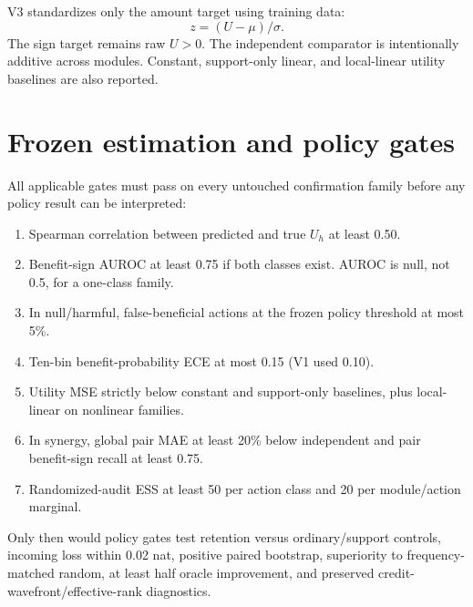 \documentclass[11pt]{article}
\begin{document}
V3 standardizes only the amount target using training data:
\[
 z=(U-\mu)/\sigma.
\]
The sign target remains raw $U>0$. The independent comparator is intentionally additive across modules. Constant, support-only linear, and local-linear utility baselines are also reported.

\section{Frozen estimation and policy gates}
All applicable gates must pass on every untouched confirmation family before any policy result can be interpreted:
\begin{enumerate}
\item Spearman correlation between predicted and true $U_h$ at least 0.50.
\item Benefit-sign AUROC at least 0.75 if both classes exist. AUROC is null, not 0.5, for a one-class family.
\item In null/harmful, false-beneficial actions at the frozen policy threshold at most 5\%.
\item Ten-bin benefit-probability ECE at most 0.15 (V1 used 0.10).
\item Utility MSE strictly below constant and support-only baselines, plus local-linear on nonlinear families.
\item In synergy, global pair MAE at least 20\% below independent and pair benefit-sign recall at least 0.75.
\item Randomized-audit ESS at least 50 per action class and 20 per module/action marginal.
\end{enumerate}
Only then would policy gates test retention versus ordinary/support controls, incoming loss within 0.02 nat, positive paired bootstrap, superiority to frequency-matched random, at least half oracle improvement, and preserved credit-wavefront/effective-rank diagnostics.
\end{document}
